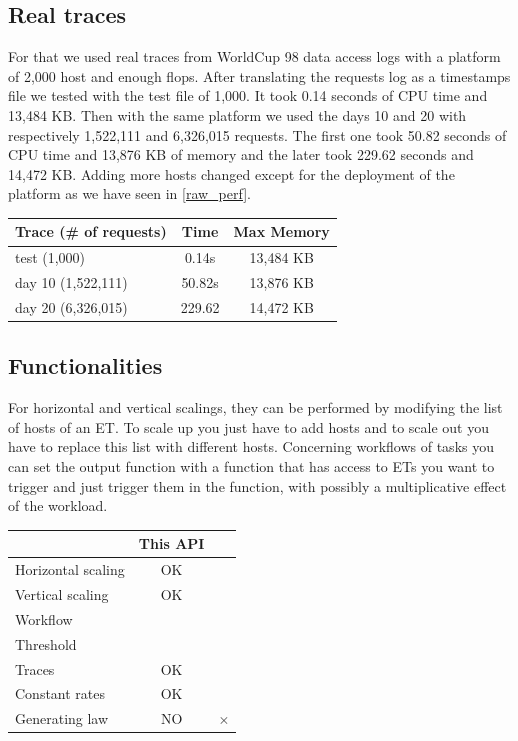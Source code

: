 \documentclass[a4paper, onecolumn]{article}
\begin{document}
       
  \subsection{Real traces}
    For that we used real traces from WorldCup 98 data access logs \cite{wc98}
    with a platform of 2,000 host and enough flops. After translating the
    requests log as a timestamps file we tested with the test file of 1,000. It
    took 0.14 seconds of CPU time and 13,484 KB. Then with the same platform we
    used the days 10 and 20 with respectively 1,522,111 and 6,326,015 requests.
    The first one took 50.82 seconds of CPU time and 13,876 KB of memory and
    the later took 229.62 seconds and 14,472 KB. Adding more hosts changed 
    except for the deployment of the platform as we have seen in \ref{raw_perf}.
    
    \begin{center}
     	\begin{tabular}{| l | c | c |}
     		\hline
     		Trace (\# of requests) & Time & Max Memory\\ 
     		\hline
     		test (1,000) & 0.14s & 13,484 KB\\
	        \hline
	        day 10 (1,522,111) & 50.82s & 13,876 KB\\
	        \hline
	        day 20 (6,326,015) & 229.62 & 14,472 KB\\
     		\hline
     	\end{tabular}
    \end{center}
  
  \subsection{Functionalities}
   For horizontal and vertical scalings, they can be performed by modifying the 
   list of hosts of an ET. To scale up you just have to add hosts and to scale 
   out you have to replace this list with different hosts. Concerning workflows 
   of tasks you can set the output function with a function that has access to 
   ETs you want to trigger and just trigger them in the function, with possibly 
   a multiplicative effect of the workload.
   
   \begin{center}
   	\begin{tabular}{| l | c | c |}
   		\hline
   		& This API & \cite{vasic2012dejavu}\\ 
   		\hline\hline
   		Horizontal scaling & OK & \checkmark\\
   		\hline
   		Vertical scaling & OK & \checkmark\\
   		\hline
   		Workflow & & \\
   		\hline
   		Threshold & & \\
   		\hline\hline
   		Traces & OK & \\
   		\hline
   		Constant rates & OK & \\
   		\hline
   		Generating law & NO & $\times$ \\
   		\hline
   	\end{tabular}
   \end{center}
  
\end{document}
